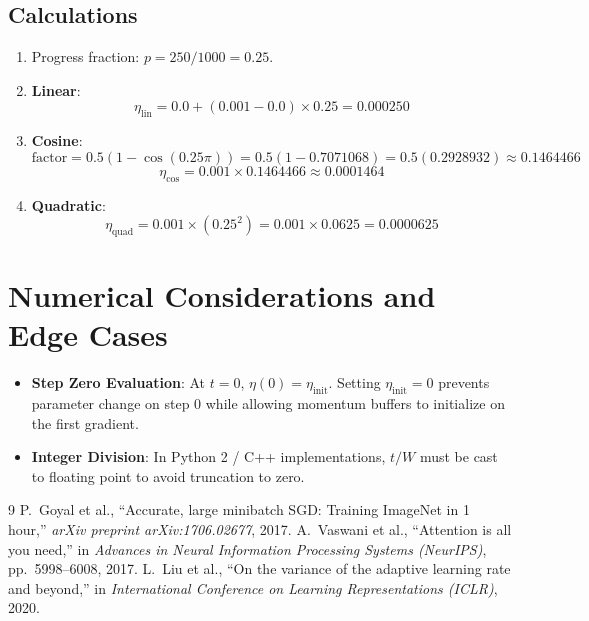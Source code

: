 \documentclass[11pt,a4paper]{article}
\theoremstyle{definition}
\begin{document}
\subsection{Calculations}
\begin{enumerate}
    \item Progress fraction: $p = 250 / 1000 = 0.25$.
    \item \textbf{Linear}:
    \begin{equation}
    \eta_{\text{lin}} = 0.0 + (0.001 - 0.0) \times 0.25 = 0.000250
    \end{equation}
    \item \textbf{Cosine}:
    \begin{equation}
    \text{factor} = 0.5(1 - \cos(0.25 \pi)) = 0.5(1 - 0.7071068) = 0.5(0.2928932) \approx 0.1464466
    \end{equation}
    \begin{equation}
    \eta_{\text{cos}} = 0.001 \times 0.1464466 \approx 0.0001464
    \end{equation}
    \item \textbf{Quadratic}:
    \begin{equation}
    \eta_{\text{quad}} = 0.001 \times (0.25^2) = 0.001 \times 0.0625 = 0.0000625
    \end{equation}
\end{enumerate}

\section{Numerical Considerations and Edge Cases}

\begin{itemize}
    \item \textbf{Step Zero Evaluation}: At $t=0$, $\eta(0) = \eta_{\text{init}}$. Setting $\eta_{\text{init}} = 0$ prevents parameter change on step 0 while allowing momentum buffers to initialize on the first gradient.
    \item \textbf{Integer Division}: In Python 2 / C++ implementations, $t / W$ must be cast to floating point to avoid truncation to zero.
\end{itemize}

\begin{thebibliography}{9}
 P.~Goyal et al., ``Accurate, large minibatch SGD: Training ImageNet in 1 hour,'' \emph{arXiv preprint arXiv:1706.02677}, 2017.
 A.~Vaswani et al., ``Attention is all you need,'' in \emph{Advances in Neural Information Processing Systems (NeurIPS)}, pp.~5998--6008, 2017.
 L.~Liu et al., ``On the variance of the adaptive learning rate and beyond,'' in \emph{International Conference on Learning Representations (ICLR)}, 2020.
\end{thebibliography}
\end{document}
